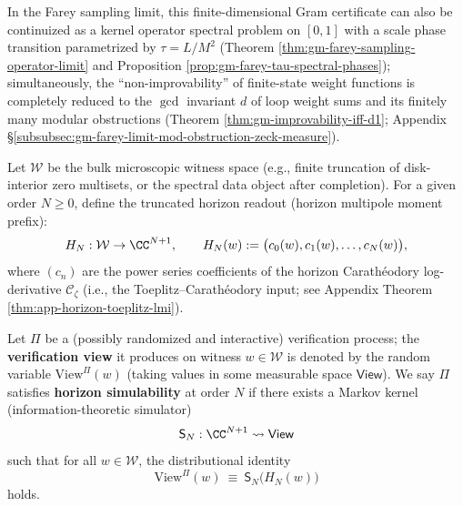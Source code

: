 In the Farey sampling limit, this finite-dimensional Gram certificate can also be continuized as a kernel operator spectral problem on \([0,1]\) with a scale phase transition parametrized by \(\tau=L/M^2\) (Theorem \ref{thm:gm-farey-sampling-operator-limit} and Proposition \ref{prop:gm-farey-tau-spectral-phases}); simultaneously, the ``non-improvability'' of finite-state weight functions is completely reduced to the \(\gcd\) invariant \(d\) of loop weight sums and its finitely many modular obstructions (Theorem \ref{thm:gm-improvability-iff-d1}; Appendix \S\ref{subsubsec:gm-farey-limit-mod-obstruction-zeck-measure}).

\begin{definition}\label{def:discussion-horizon-observable-zk}
Let \(\mathcal{W}\) be the bulk microscopic witness space (e.g., finite truncation of disk-interior zero multisets, or the spectral data object after completion).
For a given order \(N\ge 0\), define the truncated horizon readout (horizon multipole moment prefix):
\[
H_N:\mathcal{W}\to \CC^{N+1},\qquad
H_N(w):=\bigl(c_0(w),c_1(w),\dots,c_N(w)\bigr),
\]
where \((c_n)\) are the power series coefficients of the horizon Carath\'eodory log-derivative \(\mathscr{C}_\zeta\) (i.e., the Toeplitz--Carath\'eodory input; see Appendix Theorem \ref{thm:app-horizon-toeplitz-lmi}).
\par
Let \(\Pi\) be a (possibly randomized and interactive) verification process; the \textbf{verification view} it produces on witness \(w\in\mathcal{W}\) is denoted by the random variable \(\mathrm{View}^{\Pi}(w)\) (taking values in some measurable space \(\mathsf{View}\)).
We say \(\Pi\) satisfies \textbf{horizon simulability} at order \(N\) if there exists a Markov kernel (information-theoretic simulator)
\[
\mathsf{S}_N:\CC^{N+1}\rightsquigarrow \mathsf{View}
\]
such that for all \(w\in\mathcal{W}\), the distributional identity
\[
\mathrm{View}^{\Pi}(w)\ \equiv\ \mathsf{S}_N\bigl(H_N(w)\bigr)
\]
holds.
\end{definition}


